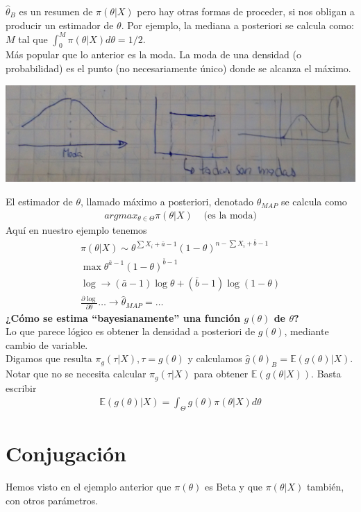 \documentclass[10pt]{article}
\theoremstyle{plain}
\theoremstyle{definition}
\begin{document}
$\hat{\theta}_{B}$ es un resumen de $\pi(\theta|X)$ pero hay otras formas de proceder, si nos obligan a producir un estimador de $\theta$. Por ejemplo, la mediana a posteriori se calcula como:\\
$M$ tal que $\int_{0}^{M}\pi(\theta|X)d\theta = 1/2$.\\
Más popular que lo anterior es la moda. La moda de una densidad (o probabilidad) es el punto (no necesariamente único) donde se alcanza el máximo.
\begin{center}
\includegraphics[scale=0.1]{imagenes/moda.jpg}
\end{center}
El estimador de $\theta$, llamado máximo a posteriori, denotado $\theta_{MAP}$ se calcula como
\begin{align*}
argmax_{\theta \in \Theta}\pi(\theta|X) & \text{ (es la moda)}
\end{align*}
Aquí en nuestro ejemplo tenemos
\begin{align*}
\pi(\theta|X) \sim \theta^{\sum X_{i} + \bar{a} - 1}(1-\theta)^{n-\sum X_{i} + \bar{b} - 1}\\
\max \theta^{\bar{a}-1}(1-\theta)^{\bar{b}-1}\\
\log \rightarrow (\bar{a}-1)\log \theta + (\bar{b}-1)\log (1-\theta)\\
\frac{\partial \log}{\partial \theta} \ldots \rightarrow \hat{\theta}_{MAP} = \ldots
\end{align*}
\textbf{¿Cómo se estima ``bayesianamente'' una función $g(\theta)$ de $\theta$?}\\
Lo que parece lógico es obtener la densidad a posteriori de $g(\theta)$, mediante cambio de variable.\\
Digamos que resulta $\pi_{g}(\tau|X), \tau = g(\theta)$ y calculamos $\hat{g}(\theta)_{B} = \mathbb{E}(g(\theta)|X)$.\\
Notar que no se necesita calcular $\pi_{g}(\tau|X)$ para obtener $\mathbb{E}(g(\theta|X))$. Basta escribir
\begin{align*}
\mathbb{E}(g(\theta)|X) = \int_{\Theta}g(\theta) \pi(\theta|X)d\theta
\end{align*}
\section{Conjugación}
Hemos visto en el ejemplo anterior que $\pi(\theta)$ es Beta y que $\pi(\theta|X)$ también, con otros parámetros.\\
\end{document}
